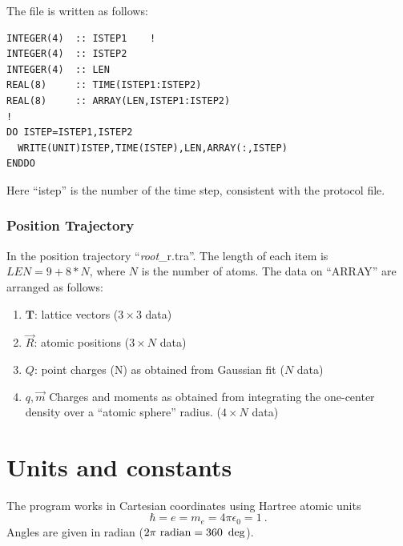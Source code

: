 \documentclass[final,12pt]{article}
\begin{document}
{{{The file is written as follows:
\begin{verbatim}
INTEGER(4)  :: ISTEP1    !
INTEGER(4)  :: ISTEP2
INTEGER(4)  :: LEN
REAL(8)     :: TIME(ISTEP1:ISTEP2)
REAL(8)     :: ARRAY(LEN,ISTEP1:ISTEP2)
!
DO ISTEP=ISTEP1,ISTEP2
  WRITE(UNIT)ISTEP,TIME(ISTEP),LEN,ARRAY(:,ISTEP)
ENDDO
\end{verbatim}

Here ``istep'' is the number of the time step, consistent with the
protocol file. 

\subsubsection{Position Trajectory}
In the position trajectory ``{\it root}\_r.tra''. The length of each
item is $LEN=9+8*N$, where $N$ is the number of atoms. The data on
``ARRAY'' are arranged as follows:
\begin{enumerate}
\item $\mathbf{T}$: lattice vectors ($3\times3$ data)
\item $\vec{R}$: atomic positions ($3\times N$ data)
\item $Q$: point charges (N) as obtained from Gaussian fit ($N$ data)
\item $q,\vec{m}$ Charges and moments as obtained from integrating the
  one-center density over a ``atomic sphere'' radius. ($4\times N$ data)
\end{enumerate}





\newpage
\section{Units and constants}
\label{constants}

The program works in Cartesian coordinates using Hartree atomic units
\begin{equation}
\hbar=e=m_e=4\pi\epsilon_0=1 \ .
\end{equation}
Angles are given in radian ($2\pi~{\rm radian}=360~\deg$).

}}}
\end{document}
